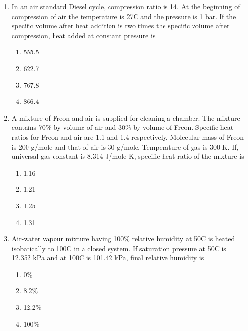 \documentclass[a4paper,10pt]{article}
\begin{document}
\begin{enumerate}
\item In an air standard Diesel cycle, compression ratio is 14. At the beginning of compression of air  the temperature is 27\degree C and the pressure is 1 bar. If the specific volume after heat addition is two times the specific volume after compression, heat added  at constant pressure is
\hfill{}

\begin{multicols}{4}
\begin{enumerate}
\item 555.5
\item 622.7
\item 767.8
\item 866.4
\end{enumerate}
\end{multicols}

\item A mixture of Freon and air is supplied for cleaning a chamber. The mixture contains 70\% by volume of air and 30\% by volume of Freon. Specific heat ratios for Freon and air are 1.1 and 1.4 respectively. Molecular mass of Freon is 200 g/mole and that of air is 30 g/mole. Temperature of gas is 300 K. If, universal gas constant is 8.314 J/mole-K, specific heat ratio of the mixture is
\hfill{}

\begin{multicols}{4}
\begin{enumerate}
\item 1.16
\item 1.21
\item 1.25
\item 1.31
\end{enumerate}
\end{multicols}

\item Air-water vapour mixture having 100\% relative humidity at 50\degree C is heated isobarically to 100\degree C in a closed system. If saturation pressure at 50\degree C is 12.352 kPa and at 100\degree C is 101.42 kPa, final relative humidity is
\hfill{}

\begin{multicols}{4}
\begin{enumerate}
\item 0\%
\item 8.2\%
\item 12.2\%
\item 100\%
\end{enumerate}
\end{multicols}


\end{enumerate}
\end{document}
